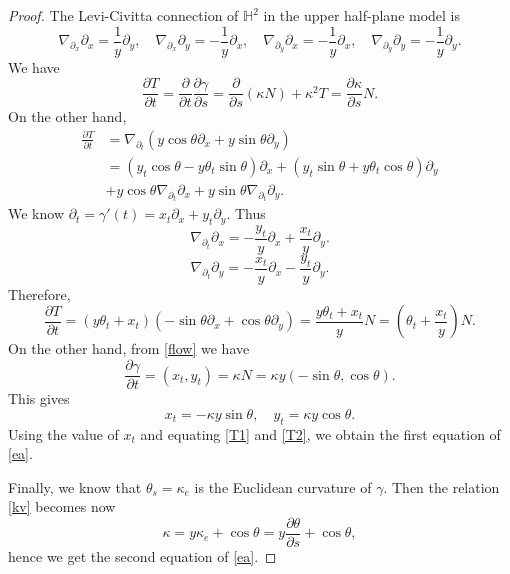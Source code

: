 \documentclass[12pt]{amsart}
\theoremstyle{plain}
\theoremstyle{definition}
\def\h{\mathbb H}
\begin{document}
\begin{proof} 
The Levi-Civitta connection of $\h^2$ in the upper half-plane model is
$$\nabla_{\partial_x}\partial_x = \frac{1}{y}\partial_y,\quad
\nabla_{\partial_x}\partial_y = -\frac{1}{y}\partial_x,\quad
\nabla_{\partial_y}\partial_x = -\frac{1}{y}\partial_x,\quad
\nabla_{\partial_y}\partial_y =- \frac{1}{y}\partial_y.$$
We have
\begin{equation}\label{T1}
\frac{\partial T}{\partial t}=\frac{\partial}{\partial
t}\frac{\partial\gamma}{\partial s}=
\frac{\partial }{\partial s}(\kappa
N)+\kappa^2T=\frac{\partial\kappa}{\partial s}N.
\end{equation}
On the other hand,
\begin{equation*}
\begin{split}
\frac{\partial T}{\partial
t}&=\nabla_{\partial_t}(y\cos\theta\partial_x+y\sin\theta \partial_y)\\
&=(y_t\cos\theta-y\theta_t\sin\theta)\partial_x+(y_t\sin\theta+y\theta_t\cos\theta)\partial_y\\
&+y\cos\theta\nabla_{\partial_t}\partial_x+y\sin\theta\nabla_{\partial_t}\partial_y.
\end{split}
\end{equation*}
We know $\partial_t=\gamma'(t)=x_t\partial_x+y_t\partial_y$. Thus
$$\nabla_{\partial_t}\partial_x=-\frac{y_t}{y}\partial_x+\frac{x_t}{y}\partial_y.$$
$$\nabla_{\partial_t}\partial_y=-\frac{x_t}{y}\partial_x-\frac{y_t}{y}\partial_y.$$
Therefore,
\begin{equation}\label{T2}
\frac{\partial T}{\partial
t}=(y\theta_t+x_t)\left(-\sin\theta\partial_x+\cos\theta\partial_y\right)=
\frac{y\theta_t+x_t}{y}N=(\theta_t+\frac{x_t}{y})N.
\end{equation}
On the other hand,  from \eqref{flow} we have
$$\frac{\partial\gamma}{\partial t}=(x_t,y_t)=\kappa N=\kappa
y(-\sin\theta,\cos\theta).$$
This gives 
\begin{equation}\label{xy} x_t=-\kappa y\sin\theta,\quad y_t=\kappa y\cos\theta.
\end{equation}
 Using the value of $x_t$ and equating \eqref{T1} and \eqref{T2}, we obtain the first equation of \eqref{ea}. 

Finally, we know that $\theta_s=\kappa_e$ is the Euclidean curvature of $\gamma$.  Then the relation \eqref{kv}   becomes now $$\kappa=y\kappa_e+\cos\theta=y\frac{\partial\theta}{\partial s}+\cos\theta,$$
hence we get the second equation of \eqref{ea}.
\end{proof}
\end{document}
